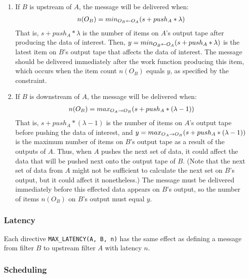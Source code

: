 \begin{enumerate}

\item If $B$ is upstream of $A$, the message will be delivered when:
\begin{align}
\label{eq:msgup}
n(O_B) = min_{O_B \leftarrow O_A}(s + push_A * \lambda)
\end{align}
That is, $s + push_A * \lambda$ is the number of items on $A$'s output tape
after producing the data of interest.  Then, $y =
min_{O_B \leftarrow O_A}(s + push_A * \lambda)$ is the latest item on $B$'s output
tape that affects the data of interest.  The message should be
delivered immediately after the work function producing this item,
which occurs when the item count $n(O_B)$ equals $y$, as specified by
the constraint.

\item If $B$ is downstream of $A$, the message will be delivered when:
\begin{align}
\label{eq:msgdown}
n(O_B) = max_{O_A \rightarrow O_B}(s + push_A * (\lambda-1))
\end{align}
That is, $s + push_A * (\lambda - 1)$ is the number of items on $A$'s
output tape before pushing the data of interest, and $y =
max_{O_A \rightarrow O_B}(s + push_A * (\lambda-1))$ is the maximum number of items
on $B$'s output tape as a result of the outputs of $A$.  Thus, when
$A$ pushes the next set of data, it could affect the data that will be
pushed next onto the output tape of $B$.  (Note that the next set of
data from $A$ might not be sufficient to calculate the next set on
$B$'s output, but it could affect it nonetheless.)  The message must
be delivered immediately before this effected data appears on $B$'s
output, so the number of items $n(O_B)$ on $B$'s output must equal $y$.

\end{enumerate}

\subsubsection{Latency}

Each directive {\tt MAX\_LATENCY(A, B, n)} has the same effect as
defining a message from filter $B$ to upstream filter $A$ with latency
$n$.

\subsubsection{Scheduling}

